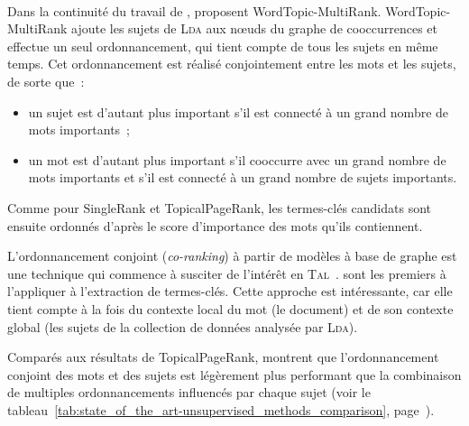         ~\\Dans la continuité du travail de ,
         proposent WordTopic-MultiRank.
        WordTopic-MultiRank ajoute les sujets de \textsc{Lda} aux n\oe{}uds du
        graphe de cooccurrences et effectue un seul ordonnancement, qui tient
        compte de tous les sujets en même temps. Cet ordonnancement est réalisé
        conjointement entre les mots et les sujets, de sorte que~:
        \begin{itemize}
          \item{un sujet est d'autant plus important s'il est connecté à un
                grand nombre de mots importants~;}
          \item{un mot est d'autant plus important s'il cooccurre avec un grand
                nombre de mots importants et s'il est connecté à un grand nombre
                de sujets importants.}
        \end{itemize}
        Comme pour SingleRank et TopicalPageRank, les termes-clés candidats sont
        ensuite ordonnés d'après le score d'importance des mots qu'ils
        contiennent.

        L'ordonnancement conjoint (\textit{co-ranking}) à partir de modèles à
        base de graphe est une technique qui commence à susciter de l'intérêt en
        \textsc{Tal}~\cite{wan2011corankingsummarization,yan2012corankingtweetrecommendation,liu2014corankingopinionmining}.
         sont les premiers à l'appliquer à
        l'extraction de termes-clés. Cette approche est intéressante, car elle
        tient compte à la fois du contexte local du mot (le document) et de son
        contexte global (les sujets de la collection de données analysée par
        \textsc{Lda}).

        Comparés aux résultats de TopicalPageRank,
         montrent que l'ordonnancement
        conjoint des mots et des sujets est légèrement plus performant que la
        combinaison de multiples ordonnancements influencés par chaque sujet
        (voir le tableau~\ref{tab:state_of_the_art-unsupervised_methods_comparison},
        page~\pageref{tab:state_of_the_art-unsupervised_methods_comparison}).

